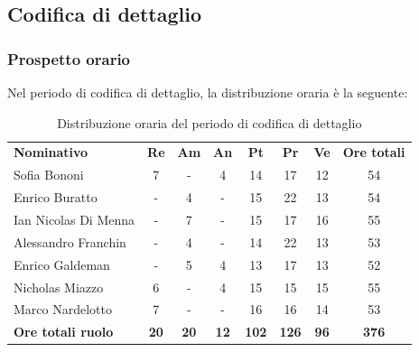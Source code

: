 \documentclass[../piano-di-progetto.tex]{subfiles}
\begin{document}
  \subsection{Codifica di dettaglio}

  \subsubsection{Prospetto orario}
  Nel periodo di codifica di dettaglio, la distribuzione oraria è la seguente:
  \begin{table}[H]
    \centering
    \begin{tabular}{lccccccc}
      \rowcolor{lightgray}
      \textbf{Nominativo}        & \textbf{Re} & \textbf{Am}  & \textbf{An} & \textbf{Pt}  & \textbf{Pr}   & \textbf{Ve} & \textbf{Ore totali} \\
      Sofia Bononi              & 7           & -           & 4           & 14           & 17           & 12          & 54           \\
      Enrico Buratto            & -           & 4           & -           & 15           & 22           & 13          & 54           \\
      Ian Nicolas Di Menna      & -           & 7           & -           & 15           & 17           & 16          & 55           \\
      Alessandro Franchin       & -           & 4           & -           & 14           & 22           & 13          & 53           \\
      Enrico Galdeman           & -           & 5           & 4           & 13           & 17           & 13          & 52           \\
      Nicholas Miazzo           & 6           & -           & 4           & 15           & 15           & 15          & 55           \\
      Marco Nardelotto          & 7           & -           & -           & 16           & 16           & 14          & 53           \\
      \textbf{Ore totali ruolo} & \textbf{20} & \textbf{20} & \textbf{12} & \textbf{102} & \textbf{126} & \textbf{96} & \textbf{376}  
    \end{tabular}
    \caption{Distribuzione oraria del periodo di codifica di dettaglio}
  \end{table}
\end{document}
